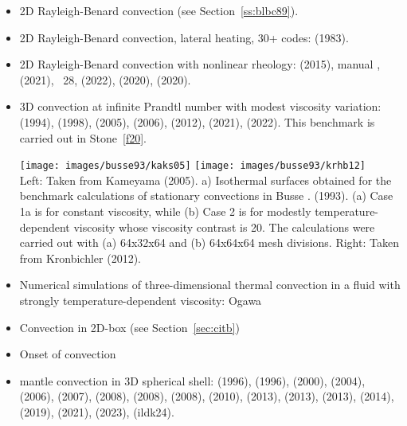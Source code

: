 \begin{itemize}
\item 2D Rayleigh-Benard convection (see Section~\ref{ss:blbc89}).

\item 2D Rayleigh-Benard convection, lateral heating, 30+ codes: 
      \textcite{dejo83} (1983).

\item 2D Rayleigh-Benard convection with nonlinear rheology:  
      \textcite{tosn15} (2015), \aspect{} manual \cite{aspectmanual}, 
      \textcite{trbs21} (2021), \stone~28, \textcite{dakg22} (2022),
      \textcite{siwi20} (2020), \textcite{casd20} (2020).

\item 3D convection at infinite Prandtl number with modest viscosity variation:
      \textcite{bucc94} (1994),
      \textcite{trha98} (1998),
      \textcite{kaks05} (2005),
      \textcite{onmm06} (2006),
      \textcite{krhb12} (2012), 
      \textcite{trbs21} (2021),
      \textcite{dakg22} (2022).
      This benchmark is carried out in Stone~\ref{f20}.

      \begin{center}
      \texttt{[image: images/busse93/kaks05]}
      \texttt{[image: images/busse93/krhb12]}\\
      {\captionfont Left: Taken from Kameyama \etal (2005).
      a) Isothermal surfaces obtained for the benchmark calculations 
      of stationary convections in Busse \etal. (1993). (a) Case 1a is for
      constant viscosity, while (b) Case 2 is for modestly temperature-dependent 
      viscosity whose viscosity contrast is 20. The calculations
      were carried out with (a) 64x32x64 and (b) 64x64x64 mesh divisions.
      Right: Taken from Kronbichler \etal (2012).}
      \end{center}

\item Numerical simulations of three-dimensional thermal convection 
      in a fluid with strongly
      temperature-dependent viscosity: Ogawa \etal \cite{ogsz91,kaks05} 

\item Convection in 2D-box \cite{galb19} (see Section~\ref{sec:citb})

\item Onset of convection \cite{aspectmanual}

\item mantle convection in 3D spherical shell:
      \textcite{rasz96} (1996),
      \textcite{iwas96} (1996),
      \textcite{zhzm00} (2000),
      \textcite{yoka04} (2004),
      \textcite{sthh06} (2006),
      \textcite{chcc07} (2007),
      \textcite{zhmt08} (2008),
      \textcite{hust08b} (2008),
      \textcite{kaks08} (2008),
      \textcite{wrfy10} (2010),
      \textcite{dadb13} (2013),
      \textcite{hutm13} (2013),
      \textcite{busa13} (2013),
      \textcite{arfw14} (2014),
      \textcite{liki19} (2019),
      \textcite{trbs21} (2021),
      \textcite{eulg23} (2023),
      \textcite{ildk24} (ildk24).


\end{itemize}
